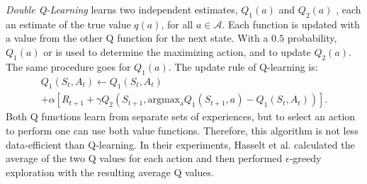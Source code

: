 \textit{Double Q-Learning} \cite{dql} learns two independent estimates, $Q_1(a)$ and $Q_2 (a)$ , each an estimate of the true value $q(a)$, for all $a \in \mathcal{A}$. Each function is updated with a value from the other Q function for the next state. 
With a $0.5$ probability, $Q_1 (a)$ or is used to determine the maximizing action, and to update $Q_2 (a)$. The same procedure goes for $Q_1 (a)$.
The update rule of Q-learning is:
\begin{multline}
Q_1(S_t,A_t)\leftarrow Q_1(S_t,A_t) \\ + \alpha \left[ R_{t+1} + \gamma Q_2(S_{t+1},\operatorname{argmax_a} Q_1(S_{t+1},a)-Q_1(S_t,A_t))\right].\end{multline}
Both Q functions learn from separate sets of experiences, but to select an action to perform one can use both value functions. Therefore, this algorithm is not less data-efficient than Q-learning. In their experiments, Hasselt et al. calculated the average of the two Q values for each action and then performed $\epsilon$-greedy exploration with the resulting average Q values.

 

